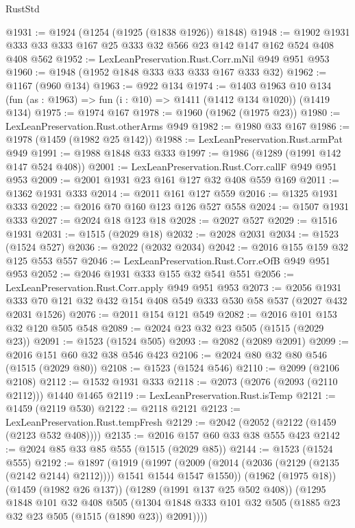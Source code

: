 \begin{lexlean}{RustStd}
\begin{coremodule}
@1931 := @1924 (@1254 (@1925 (@1838 @1926)) @1848)
@1948 := @1902 @1931 @333 @33 @333 @167 @25 @333 @32 @566 @23 @142 @147 @162 @524 @408 @408 @562
@1952 := LexLeanPreservation.Rust.Corr.mNil @949 @951 @953
@1960 := @1948 (@1952 @1848 @333 @33 @333 @167 @333 @32)
@1962 := @1167 (@960 @134)
@1963 := @922 @134
@1974 := @1403
    @1963
    @10
    @134
    (fun (as : @1963) => fun (i : @10) => @1411 (@1412 @134 @1020))
    (@1419 @134)
@1975 := @1974 @167
@1978 := @1960 (@1962 (@1975 @23))
@1980 := LexLeanPreservation.Rust.otherArms @949
@1982 := @1980 @33 @167
@1986 := @1978 (@1459 (@1982 @25 @142))
@1988 := LexLeanPreservation.Rust.armPat @949
@1991 := @1988 @1848 @33 @333
@1997 := @1986 (@1289 (@1991 @142 @147 @524 @408))
@2001 := LexLeanPreservation.Rust.Corr.callF @949 @951 @953
@2009 := @2001 @1931 @23 @161 @127 @32 @408 @559 @169
@2011 := @1362 @1931 @333
@2014 := @2011 @161 @127 @559
@2016 := @1325 @1931 @333
@2022 := @2016 @70 @160 @123 @126 @527 @558
@2024 := @1507 @1931 @333
@2027 := @2024 @18 @123 @18
@2028 := @2027 @527
@2029 := @1516 @1931
@2031 := @1515 (@2029 @18)
@2032 := @2028 @2031
@2034 := @1523 (@1524 @527)
@2036 := @2022 (@2032 @2034)
@2042 := @2016 @155 @159 @32 @125 @553 @557
@2046 := LexLeanPreservation.Rust.Corr.eOfB @949 @951 @953
@2052 := @2046 @1931 @333 @155 @32 @541 @551
@2056 := LexLeanPreservation.Rust.Corr.apply @949 @951 @953
@2073 := @2056
    @1931
    @333
    @70
    @121
    @32
    @432
    @154
    @408
    @549
    @333
    @530
    @58
    @537
    (@2027 @432 @2031 @1526)
@2076 := @2011 @154 @121 @549
@2082 := @2016 @101 @153 @32 @120 @505 @548
@2089 := @2024 @23 @32 @23 @505 (@1515 (@2029 @23))
@2091 := @1523 (@1524 @505)
@2093 := @2082 (@2089 @2091)
@2099 := @2016 @151 @60 @32 @38 @546 @423
@2106 := @2024 @80 @32 @80 @546 (@1515 (@2029 @80))
@2108 := @1523 (@1524 @546)
@2110 := @2099 (@2106 @2108)
@2112 := @1532 @1931 @333
@2118 := @2073 (@2076 (@2093 (@2110 @2112))) @1440 @1465
@2119 := LexLeanPreservation.Rust.isTemp
@2121 := @1459 (@2119 @530)
@2122 := @2118 @2121
@2123 := LexLeanPreservation.Rust.tempFresh
@2129 := @2042 (@2052 (@2122 (@1459 (@2123 @532 @408))))
@2135 := @2016 @157 @60 @33 @38 @555 @423
@2142 := @2024 @85 @33 @85 @555 (@1515 (@2029 @85))
@2144 := @1523 (@1524 @555)
@2192 := @1897
    (@1919
      (@1997 (@2009 (@2014 (@2036 (@2129 (@2135 (@2142 @2144) @2112)))) @1541 @1544 @1547 @1550))
      (@1962 (@1975 @18))
      (@1459 (@1982 @26 @137))
      (@1289 (@1991 @137 @25 @502 @408))
      (@1295
        @1848
        @101
        @32
        @408
        @505
        (@1304 @1848 @333 @101 @32 @505 (@1885 @23 @32 @23 @505 (@1515 (@1890 @23)) @2091))))

\end{coremodule}
\end{lexlean}
